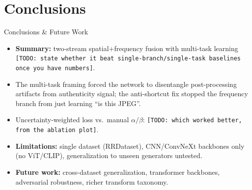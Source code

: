 \section{Conclusions}

\begin{frame}{Conclusions \& Future Work}
  \begin{itemize}
    \item \textbf{Summary:} two-stream spatial+frequency fusion with multi-task learning \texttt{[TODO: state whether it beat single-branch/single-task baselines once you have numbers]}.
    \item The multi-task framing forced the network to disentangle post-processing artifacts from authenticity signal; the anti-shortcut fix stopped the frequency branch from just learning ``is this JPEG''.
    \item Uncertainty-weighted loss vs.\ manual $\alpha/\beta$: \texttt{[TODO: which worked better, from the ablation plot]}.
    \item \textbf{Limitations:} single dataset (RRDataset), CNN/ConvNeXt backbones only (no ViT/CLIP), generalization to unseen generators untested.
    \item \textbf{Future work:} cross-dataset generalization, transformer backbones, adversarial robustness, richer transform taxonomy.
  \end{itemize}
\end{frame}
